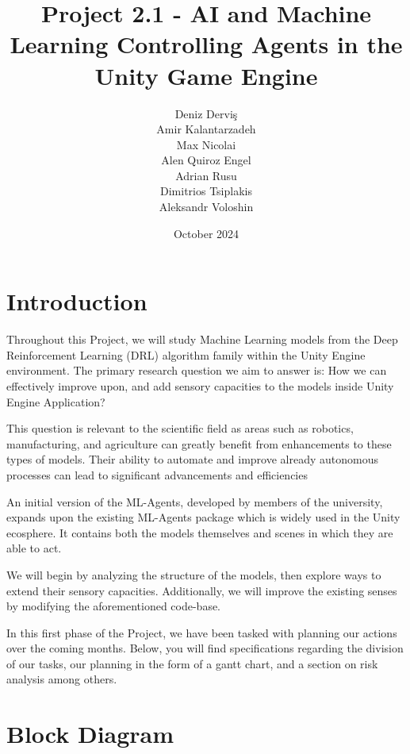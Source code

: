 \documentclass{article}
\title{Project 2.1 - AI and Machine Learning
Controlling Agents in the Unity Game Engine}
\author{Deniz Derviş \\ Amir Kalantarzadeh \\ Max Nicolai \\ Alen Quiroz Engel \\ Adrian Rusu \\ Dimitrios Tsiplakis \\ Aleksandr Voloshin}
\date{October 2024}
\begin{document}
\maketitle

\section{Introduction}
\begin{flushleft}

 \hspace{2em}Throughout this Project, we will study Machine Learning models from the Deep Reinforcement Learning (DRL) algorithm family within the Unity Engine environment. The primary research question we aim to answer is: How we can effectively improve upon, and add sensory capacities to the models inside Unity Engine Application?

 \hspace{2em}This question is relevant to the scientific field as areas such as robotics, manufacturing, and agriculture can greatly benefit from enhancements to these types of models. Their ability to automate and improve already autonomous processes can lead to significant advancements and efficiencies

\hspace{2em}An initial version of the ML-Agents, developed by members of the university, expands upon the existing ML-Agents package which is widely used in the Unity ecosphere. It contains both the models themselves and scenes in which they are able to act.

\hspace{2em}We will begin by analyzing the structure of the models, then explore ways to extend their sensory capacities. Additionally, we will improve the existing senses by modifying the aforementioned code-base.

\hspace{2em}In this first phase of the Project, we have been tasked with planning our actions over the coming months. Below, you will find specifications regarding the division of our tasks, our planning in the form of a gantt chart, and a section on risk analysis among others.


\end{flushleft}


\section{Block Diagram}
\end{document}
